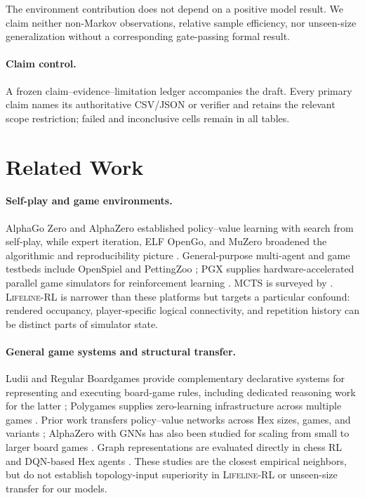 \documentclass{article}
\newcommand{\lifeline}{\textsc{Lifeline-RL}}
\begin{document}
The environment contribution does not depend on a positive model result. We
claim neither non-Markov observations, relative sample efficiency, nor
unseen-size generalization without a corresponding gate-passing formal result.

\paragraph{Claim control.}
A frozen claim--evidence--limitation ledger accompanies the draft. Every primary
claim names its authoritative CSV/JSON or verifier and retains the relevant
scope restriction; failed and inconclusive cells remain in all tables.

\section{Related Work}
\label{sec:related}

\paragraph{Self-play and game environments.}
AlphaGo Zero and AlphaZero established policy--value learning with search from
self-play, while expert iteration, ELF OpenGo, and MuZero broadened the
algorithmic and reproducibility picture
\citep{silver2017mastering,silver2018general,anthony2017thinking,
tian2019elf,schrittwieser2020mastering}. General-purpose multi-agent and game
testbeds include OpenSpiel and PettingZoo
\citep{lanctot2019openspiel,terry2020pettingzoo}; PGX supplies
hardware-accelerated parallel game simulators for reinforcement learning
\citep{koyamada2023pgx}. MCTS is surveyed by \citet{browne2012survey}.
\lifeline{} is narrower than these platforms but
targets a particular confound: rendered occupancy, player-specific logical
connectivity, and repetition history can be distinct parts of simulator state.

\paragraph{General game systems and structural transfer.}
Ludii and Regular Boardgames provide complementary declarative systems for
representing and executing board-game rules, including dedicated reasoning
work for the latter \citep{piette2020ludii,kowalski2019regular,
kowalski2020efficient}; Polygames supplies zero-learning infrastructure across
multiple games \citep{cazenave2021polygames}. Prior work transfers
policy--value networks across Hex sizes, games, and variants
\citep{gao2019transferable,soemers2021transfer}; AlphaZero with GNNs has also
been studied for scaling from small to larger board games
\citep{benassayag2021smalllarge}. Graph representations are evaluated directly
in chess RL and DQN-based Hex agents
\citep{rigaux2024chessgraph,keller2023hexgnn}. These studies are the closest
empirical neighbors, but do not establish topology-input superiority in
\lifeline{} or unseen-size transfer for our models.
\end{document}
